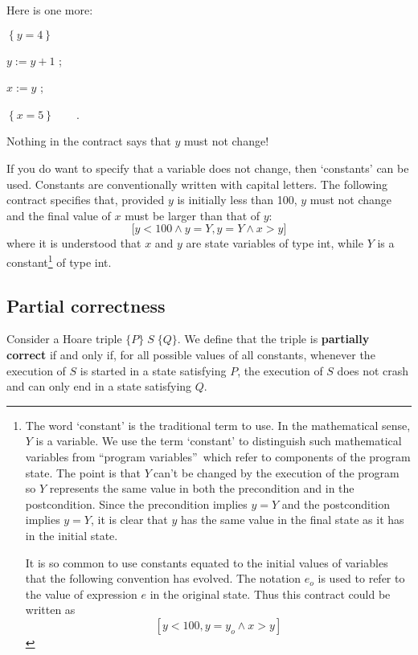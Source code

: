\documentclass[11pt]{article}%
\begin{document}
\noindent Here is one more:

\begin{code}
$\left\{  y=4\right\}  $

$y:=y+1$ ;

$x:=y$ ;

$\left\{  x=5\right\}  \qquad$.
\end{code}

\noindent Nothing in the contract says that $y$ must not change!

If you do want to specify that a variable does not change, then `constants'
can be used. Constants are conventionally written with capital letters. The
following contract specifies that, provided $y$ is initially less than 100,
$y$ must not change and the final value of $x$ must be larger than that of
$y$:%
\[
\lbrack y<\mathrm{100}\wedge y=Y,y=Y\wedge x>y]
\]
where it is understood that $x$ and $y$ are state variables of type
\textsf{int},\textsf{ }while $Y$ is a constant\footnote{The word `constant' is
the traditional term to use. In the mathematical sense, $Y$ is a variable. We
use the term `constant' to distinguish such mathematical variables from
\textquotedblleft program variables\textquotedblright\ which refer to
components of the program state. The point is that $Y\ $can't be changed by
the execution of the program so $Y$ represents the same value in both the
precondition and in the postcondition. Since the precondition implies $y=Y$
and the postcondition implies $y=Y$, it is clear that $y$ has the same value
in the final state as it has in the initial state.
\par
It is so common to use constants equated to the initial values of variables
that the following convention has evolved. The notation $e_{o}$ is used to
refer to the value of expression $e$ in the original state. Thus this contract
could be written as%
\[
\left[  y<100,y=y_{o}\wedge x>y\right]
\]
} of type \textsf{int}.

\subsection{Partial correctness}

Consider a Hoare triple $\{P\}\;S\;\{Q\}$. We define that the triple is
\textbf{partially correct} if and only if, for all possible values of all
constants, whenever the execution of $S$ is started in a state satisfying $P$,
the execution of $S$ does not crash and can only end in a state satisfying $Q$.
\end{document}
